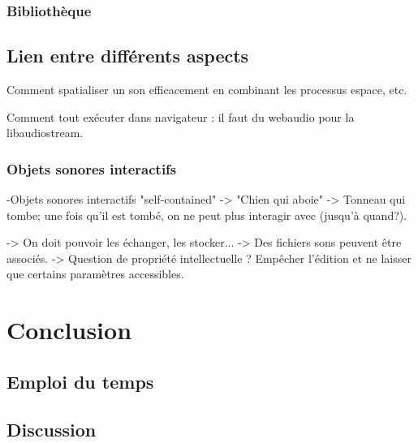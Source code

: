 \documentclass[french,a4paper]{book}
\begin{document}
\subsection{Bibliothèque}

\section{Lien entre différents aspects}
Comment spatialiser un son efficacement en combinant les processus espace, etc.

Comment tout exécuter dans navigateur : il faut du webaudio pour la libaudiostream.

\subsection{Objets sonores interactifs}
-Objets sonores interactifs "self-contained"
-> "Chien qui aboie" 
-> Tonneau qui tombe; une fois qu'il est tombé, on ne peut plus interagir avec (jusqu'à quand?).

-> On doit pouvoir les échanger, les stocker...
-> Des fichiers sons peuvent être associés.
-> Question de propriété intellectuelle ? 
Empêcher l'édition et ne laisser que certains paramètres accessibles.
\chapter{Conclusion}
\section{Emploi du temps}
\section{Discussion}
\end{document}
